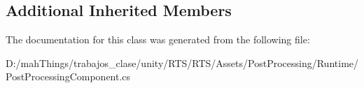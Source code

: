 \subsection*{Additional Inherited Members}


The documentation for this class was generated from the following file\+:\begin{DoxyCompactItemize}
\item 
D\+:/mah\+Things/trabajos\+\_\+clase/unity/\+R\+T\+S/\+R\+T\+S/\+Assets/\+Post\+Processing/\+Runtime/Post\+Processing\+Component.\+cs\end{DoxyCompactItemize}
